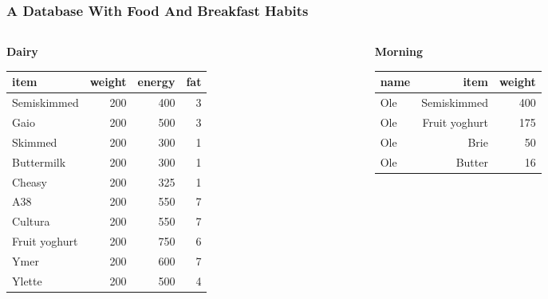 \documentclass[dvipsnames]{beamer}
\begin{document}
\begin{frame}
\frametitle{A Database With Food And Breakfast Habits}
  
\begin{columns}[t]
\begin{column}{.5\textwidth}
\textbf{Dairy} \\
\begin{footnotesize}
\begin{tabular}{|l|r|r|r|}\hline 
   item    &     weight &  energy &  fat \\ \hline
   Semiskimmed &    200 &    400  &   3 \\
   Gaio     &       200 &    500  &   3 \\
   Skimmed     &    200 &    300  &   1 \\
   Buttermilk &     200 &    300  &   1 \\
   Cheasy &         200 &    325  &   1 \\
   A38 &            200 &    550  &   7 \\
   Cultura &        200 &    550  &   7 \\
   Fruit yoghurt &  200 &    750  &   6 \\ 
   Ymer &           200 &    600  &   7 \\
   Ylette &         200 &    500  &   4 \\ \hline
 \end{tabular}
\end{footnotesize}
\end{column}
\begin{column}{.4\textwidth}
\textbf{Morning} \\
\begin{footnotesize}
  \begin{tabular}{|l|r|r|}\hline
    name  &  item           & weight \\ \hline
    Ole   &  Semiskimmed    & 400 \\
    Ole   &  Fruit yoghurt  & 175 \\
    Ole   &  Brie           &  50 \\
    Ole   &  Butter         &  16 \\

\end{tabular}
\end{footnotesize}
\end{column}
\end{columns}
\end{frame}
\end{document}
